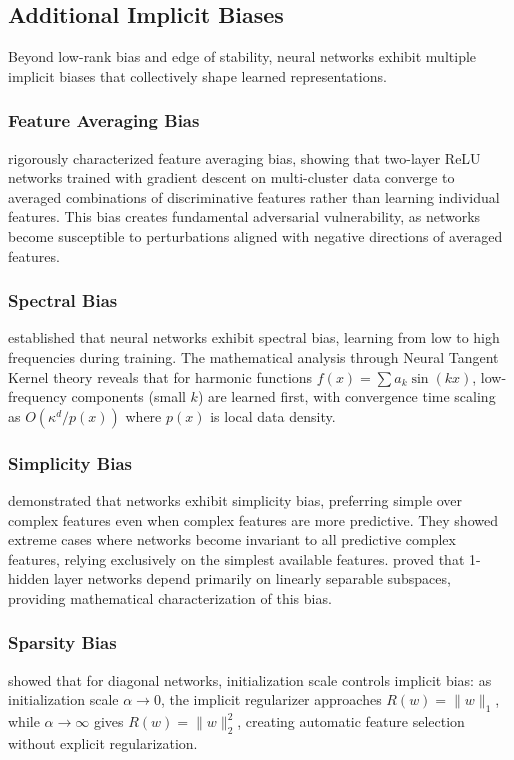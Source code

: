 \documentclass[11pt]{article}
\begin{document}
\subsection{Additional Implicit Biases}

Beyond low-rank bias and edge of stability, neural networks exhibit multiple implicit biases that collectively shape learned representations.

\subsubsection{Feature Averaging Bias}
\citet{li2024feature} rigorously characterized feature averaging bias, showing that two-layer ReLU networks trained with gradient descent on multi-cluster data converge to averaged combinations of discriminative features rather than learning individual features. This bias creates fundamental adversarial vulnerability, as networks become susceptible to perturbations aligned with negative directions of averaged features.

\subsubsection{Spectral Bias}
\citet{rahaman2019spectral} established that neural networks exhibit spectral bias, learning from low to high frequencies during training. The mathematical analysis through Neural Tangent Kernel theory reveals that for harmonic functions $f(x) = \sum a_k \sin(kx)$, low-frequency components (small $k$) are learned first, with convergence time scaling as $O(\kappa^d/p(x))$ where $p(x)$ is local data density.

\subsubsection{Simplicity Bias}
\citet{shah2020pitfalls} demonstrated that networks exhibit simplicity bias, preferring simple over complex features even when complex features are more predictive. They showed extreme cases where networks become invariant to all predictive complex features, relying exclusively on the simplest available features. \citet{morwani2023simplicity} proved that 1-hidden layer networks depend primarily on linearly separable subspaces, providing mathematical characterization of this bias.

\subsubsection{Sparsity Bias}
\citet{woodworth2020kernel} showed that for diagonal networks, initialization scale controls implicit bias: as initialization scale $\alpha \to 0$, the implicit regularizer approaches $R(w) = \|w\|_1$, while $\alpha \to \infty$ gives $R(w) = \|w\|_2^2$, creating automatic feature selection without explicit regularization.
\end{document}
